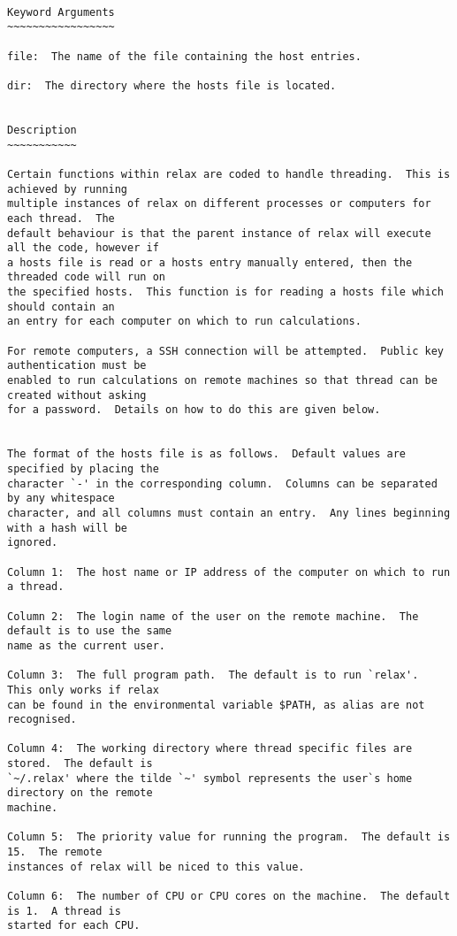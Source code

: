 {\scriptsize
\begin{verbatim}

Keyword Arguments
~~~~~~~~~~~~~~~~~

file:  The name of the file containing the host entries.

dir:  The directory where the hosts file is located.


Description
~~~~~~~~~~~

Certain functions within relax are coded to handle threading.  This is achieved by running
multiple instances of relax on different processes or computers for each thread.  The
default behaviour is that the parent instance of relax will execute all the code, however if
a hosts file is read or a hosts entry manually entered, then the threaded code will run on
the specified hosts.  This function is for reading a hosts file which should contain an
an entry for each computer on which to run calculations.

For remote computers, a SSH connection will be attempted.  Public key authentication must be
enabled to run calculations on remote machines so that thread can be created without asking
for a password.  Details on how to do this are given below.


The format of the hosts file is as follows.  Default values are specified by placing the
character `-' in the corresponding column.  Columns can be separated by any whitespace
character, and all columns must contain an entry.  Any lines beginning with a hash will be
ignored.

Column 1:  The host name or IP address of the computer on which to run a thread.

Column 2:  The login name of the user on the remote machine.  The default is to use the same
name as the current user.

Column 3:  The full program path.  The default is to run `relax'.  This only works if relax
can be found in the environmental variable $PATH, as alias are not recognised.

Column 4:  The working directory where thread specific files are stored.  The default is
`~/.relax' where the tilde `~' symbol represents the user`s home directory on the remote
machine.

Column 5:  The priority value for running the program.  The default is 15.  The remote
instances of relax will be niced to this value.

Column 6:  The number of CPU or CPU cores on the machine.  The default is 1.  A thread is
started for each CPU.


\end{verbatim}}
